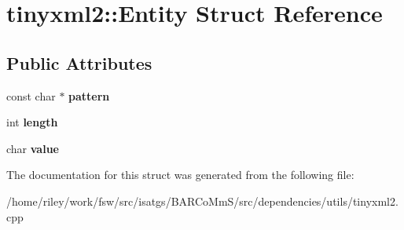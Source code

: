 \hypertarget{structtinyxml2_1_1_entity}{}\section{tinyxml2\+:\+:Entity Struct Reference}
\label{structtinyxml2_1_1_entity}
\subsection*{Public Attributes}
\begin{DoxyCompactItemize}
\item 
const char $\ast$ {\bfseries pattern}\hypertarget{structtinyxml2_1_1_entity_ab330f5d665d29bfc811ecfa76315894b}{}\label{structtinyxml2_1_1_entity_ab330f5d665d29bfc811ecfa76315894b}

\item 
int {\bfseries length}\hypertarget{structtinyxml2_1_1_entity_a25e2b57cb59cb4fa68f283d7cb570f21}{}\label{structtinyxml2_1_1_entity_a25e2b57cb59cb4fa68f283d7cb570f21}

\item 
char {\bfseries value}\hypertarget{structtinyxml2_1_1_entity_a7334e81e33b4615655a403711b24f3ed}{}\label{structtinyxml2_1_1_entity_a7334e81e33b4615655a403711b24f3ed}

\end{DoxyCompactItemize}


The documentation for this struct was generated from the following file\+:\begin{DoxyCompactItemize}
\item 
/home/riley/work/fsw/src/isatgs/\+B\+A\+R\+Co\+Mm\+S/src/dependencies/utils/tinyxml2.\+cpp\end{DoxyCompactItemize}
